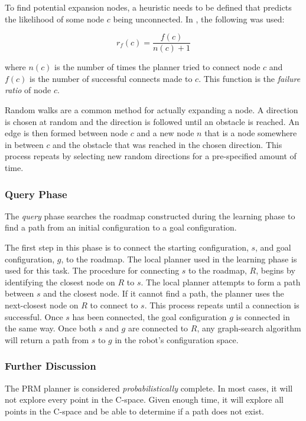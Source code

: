 \documentclass[10pt,conference]{ieeeconf}
\begin{document}
To find potential expansion nodes, a heuristic needs to be defined that predicts the likelihood of some node $c$ being unconnected. In \cite{PRM}, the following was used:

\begin{equation}
r_f(c) = \frac{f(c)}{n(c)+1}
\end{equation}

where $n(c)$ is the number of times the planner tried to connect node $c$ and $f(c)$ is the number of successful connects made to $c$. This function is the \emph{failure ratio} of node $c$.  

Random walks are a common method for actually expanding a node. A direction is chosen at random and the direction is followed until an obstacle is reached. An edge is then formed between node $c$ and a new node $n$ that is a node somewhere in between $c$ and the obstacle that was reached in the chosen direction. This process repeats by selecting new random directions for a pre-specified amount of time.

\subsubsection{Query Phase}

The \emph{query} phase searches the roadmap constructed during the learning phase to find a path from an initial configuration to a goal configuration. 

The first step in this phase is to connect the starting configuration, $s$, and goal configuration, $g$, to the roadmap. The local planner used in the learning phase is used for this task. The procedure for connecting $s$ to the roadmap, $R$, begins by identifying the closest node on $R$ to $s$. The local planner attempts to form a path between $s$ and the closest node. If it cannot find a path, the planner uses the next-closest node on $R$ to connect to $s$. This process repeats until a connection is successful. Once $s$ has been connected, the goal configuration $g$ is connected in the same way. Once both $s$ and $g$ are connected to $R$, any graph-search algorithm will return a path from $s$ to $g$ in the robot's configuration space.

\subsubsection{Further Discussion}

The PRM planner is considered \emph{probabilistically} complete. In most cases, it will not explore every point in the C-space. Given enough time, it will explore all points in the C-space and be able to determine if a path does not exist. 
\end{document}
